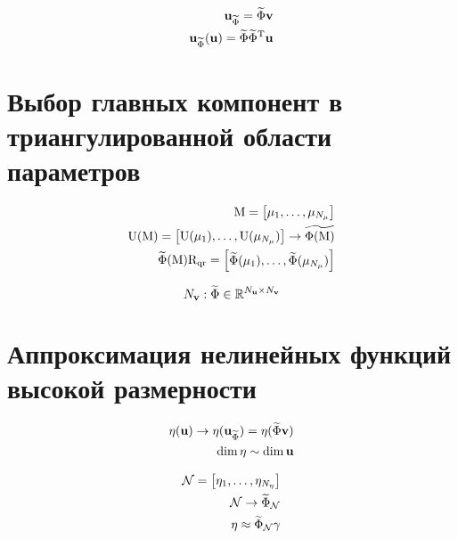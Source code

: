 \begin{align}
    \unk_{\widetilde{\Phi}} = \widetilde{\Phi} \vunk \\
    \unk_{\widetilde{\Phi}}(\unk) = \widetilde{\Phi} \transpose{\widetilde{\Phi}} \unk
\end{align}

\section{Выбор главных компонент в триангулированной области параметров}

\begin{align}
    \matr{M} =\begin{bmatrix}
        \param_1, \dots, \param_{N_\param}
    \end{bmatrix}\\
    \matr{U}(\matr{M}) =
    \begin{bmatrix}
        \matr{U}(\param_1), \dots, \matr{U}(\param_{N_\param})
    \end{bmatrix}
    \rightarrow \widetilde{\Phi (\matr{M})} \\
    \widetilde{\Phi} (\matr{M}) \matr{R}_\text{qr} =
    \begin{bmatrix}
        \widetilde{\Phi}(\param_1), \dots,  \widetilde{\Phi}(\param_{N_\param})
    \end{bmatrix}
\end{align}

\begin{equation}
N_{\mathbf{v}} : \widetilde{\Phi} \in \mathbb{R}^{N_{\mathbf{u}} \times N_{\mathbf{v}}}
\end{equation}

\section{Аппроксимация нелинейных функций высокой размерности}

\begin{align}
 \mathbf{\eta}(\mathbf{u}) \rightarrow \mathbf{\eta} (\mathbf{u}_{\widetilde{\Phi}}) = \mathbf{\eta} (\widetilde{\Phi} \mathbf{v}) \\
 \dim{\mathbf{\eta}} \sim \dim{\mathbf{u}}
\end{align}

\begin{align}
    \mathcal{N} =
    \begin{bmatrix}
        \mathbf{\eta}_1, \dots,  \mathbf{\eta}_{N_{\mathbf{\eta}}}
    \end{bmatrix} \\
    \mathcal{N} \rightarrow \widetilde{\Phi}_\mathcal{N} \\
    \mathbf{\eta} \approx \widetilde{\Phi}_\mathcal{N} \mathbf{\gamma}
\end{align}

